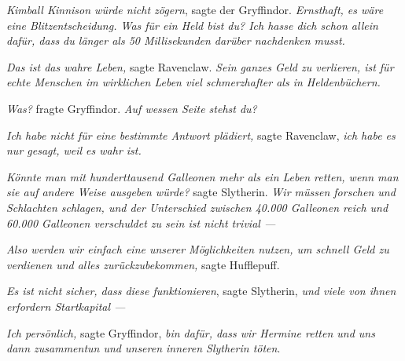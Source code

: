 \emph{Kimball Kinnison würde nicht zögern}, sagte der Gryffindor. \emph{Ernsthaft, es wäre eine Blitzentscheidung. Was für ein Held bist du? Ich hasse dich schon allein dafür, dass du länger als 50 Millisekunden darüber nachdenken musst.}

\emph{Das ist das wahre Leben,} sagte Ravenclaw. \emph{Sein ganzes Geld zu verlieren, ist für echte Menschen im wirklichen Leben viel schmerzhafter als in Heldenbüchern.}

\emph{Was?} fragte Gryffindor. \emph{Auf wessen Seite stehst du?}

\emph{Ich habe nicht für eine bestimmte Antwort plädiert,} sagte Ravenclaw, \emph{ich habe es nur gesagt, weil es wahr ist.}

\emph{Könnte man mit hunderttausend Galleonen mehr als ein Leben retten, wenn man sie auf andere Weise ausgeben würde?} sagte Slytherin. \emph{Wir müssen forschen und Schlachten schlagen, und der Unterschied zwischen 40.000 Galleonen reich und 60.000 Galleonen verschuldet zu sein ist nicht trivial —}

\emph{Also werden wir einfach eine unserer Möglichkeiten nutzen, um schnell Geld zu verdienen und alles zurückzubekommen,} sagte Hufflepuff.

\emph{Es ist nicht sicher, dass diese funktionieren}, sagte Slytherin, \emph{und viele von ihnen erfordern Startkapital —}

\emph{Ich persönlich,} sagte Gryffindor, \emph{bin dafür, dass wir Hermine retten und uns dann zusammentun und unseren inneren Slytherin töten}.

